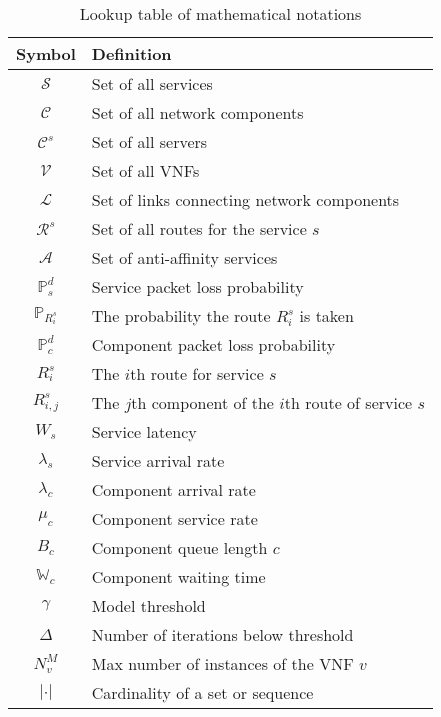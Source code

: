 \documentclass[journal]{IEEEtran}
\begin{document}
\vspace{0.5em}
\begin{table}[h]
	\caption{Lookup table of mathematical notations}
	\label{tab:definition}
	\center
	\begin{tabular}{c|l}
		\hline
		Symbol & Definition \\
		\hline
        $\mathcal{S}$     & Set of all services \\
        $\mathcal{C}$     & Set of all network components \\
        $\mathcal{C}^{s}$ & Set of all servers \\
        $\mathcal{V}$     & Set of all VNFs \\
        $\mathcal{L}$     & Set of links connecting network components\\
        $\mathcal{R}^s$   & Set of all routes for the service $s$ \\
		$\mathcal{A}$     & Set of anti-affinity services \\
		\hline
		$\mathbb{P}^d_s$ & Service packet loss probability \\
		$\mathbb{P}_{R^s_i}$ & The probability the route $R^s_{i}$ is taken \\
		$\mathbb{P}^d_c$ & Component packet loss probability \\
		$R^s_{i}$       & The $i$th route for service $s$ \\
		$R^s_{i,j}$     & The $j$th component of the $i$th route of service $s$ \\
		$W_s$ & Service latency \\
		$\lambda_s$ & Service arrival rate \\
		$\lambda_c$ & Component arrival rate \\
		$\mu_c$ & Component service rate \\
		$B_c$ & Component queue length $c$ \\
		$\mathbb{W}_c$ & Component waiting time \\
        \hline
		$\gamma$ & Model threshold \\
		$\Delta$ & Number of iterations below threshold \\ 

		$N^M_v$ & Max number of instances of the VNF $v$ \\

		$|\cdot|$ & Cardinality of a set or sequence \\
		\hline
	\end{tabular}
\end{table}
\end{document}
